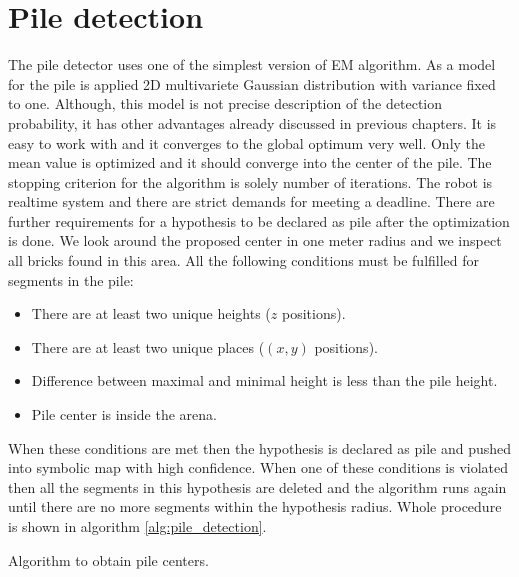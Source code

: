\section{Pile detection}
The pile detector uses one of the simplest version of EM algorithm. As a model for the pile is applied 2D multivariete Gaussian distribution with variance fixed to one. Although, this model is not precise description of the detection probability, it has other advantages already discussed in previous chapters. It is easy to work with and it converges to the global optimum very well. Only the mean value is optimized and it should converge into the center of the pile. The stopping criterion for the algorithm is solely number of iterations. The robot is realtime system and there are strict demands for meeting a deadline. There are further requirements for a hypothesis to be declared as pile after the optimization is done. We look around the proposed center in one meter radius and we inspect all bricks found in this area. All the following conditions must be fulfilled for segments in the pile:
\begin{itemize}
\item There are at least two unique heights ($z$ positions).
\item There are at least two unique places ($(x,y)$ positions).
\item Difference between maximal and minimal height is less than the pile height.
\item Pile center is inside the arena.
\end{itemize}
When these conditions are met then the hypothesis is declared as pile and pushed into symbolic map with high confidence. When one of these conditions is violated then all the segments in this hypothesis are deleted and the algorithm runs again until there are no more segments within the hypothesis radius. Whole procedure is shown in algorithm \ref{alg:pile_detection}.

\begin{algorithm}[]
 \caption{Algorithm to obtain pile centers.}
 \label{alg:pile_detection}
\end{algorithm}

